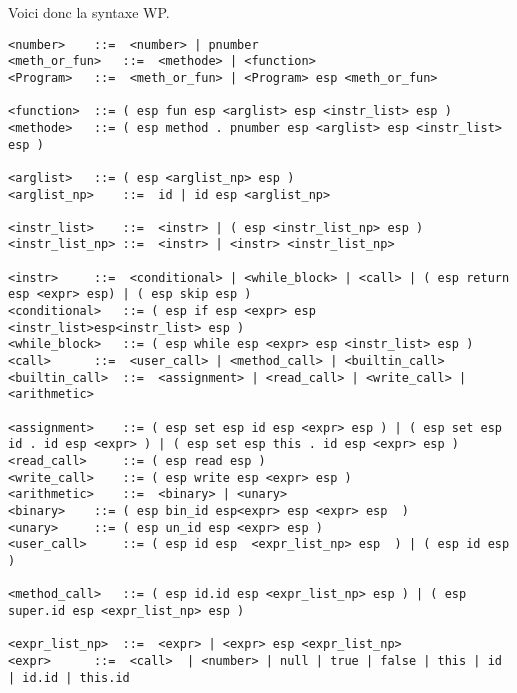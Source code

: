 Voici donc la syntaxe WP. 
\begin{verbatim}
<number>	::=  <number> | pnumber		
<meth_or_fun> 	::=  <methode> | <function>
<Program> 	::=  <meth_or_fun> | <Program> esp <meth_or_fun>

<function> 	::= ( esp fun esp <arglist> esp <instr_list> esp ) 
<methode> 	::= ( esp method . pnumber esp <arglist> esp <instr_list> esp ) 

<arglist>	::= ( esp <arglist_np> esp )
<arglist_np> 	::=  id | id esp <arglist_np>

<instr_list> 	::=  <instr> | ( esp <instr_list_np> esp ) 
<instr_list_np> ::=  <instr> | <instr> <instr_list_np>

<instr> 	::=  <conditional> | <while_block> | <call> | ( esp return esp <expr> esp) | ( esp skip esp )
<conditional> 	::= ( esp if esp <expr> esp <instr_list>esp<instr_list> esp ) 
<while_block> 	::= ( esp while esp <expr> esp <instr_list> esp ) 
<call> 		::=  <user_call> | <method_call> | <builtin_call> 
<builtin_call> 	::=  <assignment> | <read_call> | <write_call> | <arithmetic>

<assignment> 	::= ( esp set esp id esp <expr> esp ) | ( esp set esp id . id esp <expr> ) | ( esp set esp this . id esp <expr> esp )
<read_call>  	::= ( esp read esp ) 
<write_call> 	::= ( esp write esp <expr> esp )
<arithmetic> 	::=  <binary> | <unary>
<binary> 	::= ( esp bin_id esp<expr> esp <expr> esp  )
<unary>  	::= ( esp un_id esp <expr> esp )
<user_call>  	::= ( esp id esp  <expr_list_np> esp  ) | ( esp id esp ) 

<method_call>  	::= ( esp id.id esp <expr_list_np> esp ) | ( esp super.id esp <expr_list_np> esp ) 

<expr_list_np> 	::=  <expr> | <expr> esp <expr_list_np>
<expr> 		::=  <call>  | <number> | null | true | false | this | id | id.id | this.id
\end{verbatim}

